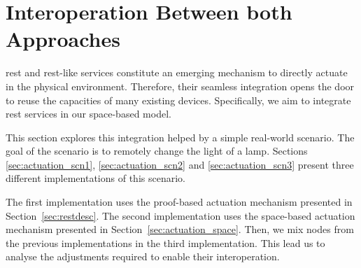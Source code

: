 \section{Interoperation Between both Approaches}
\label{sec:actuation_interoperation}


\ac{rest} and \ac{rest}-like services constitute an emerging mechanism to directly actuate in the physical environment.
Therefore, their seamless integration opens the door to reuse the capacities of many existing devices. %
Specifically, we aim to integrate \ac{rest} services in our space-based model. %


This section explores this integration helped by a simple real-world scenario.
The goal of the scenario is to remotely change the light of a lamp.
Sections \ref{sec:actuation_scn1}, \ref{sec:actuation_scn2} and \ref{sec:actuation_scn3} present three different implementations of this scenario. %


The first implementation uses the proof-based actuation mechanism presented in Section~\ref{sec:restdesc}.
The second implementation uses the space-based actuation mechanism presented in Section~\ref{sec:actuation_space}.
Then, we mix nodes from the previous implementations in the third implementation.
This lead us to analyse the adjustments required to enable their interoperation.
